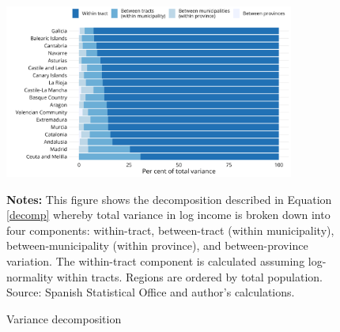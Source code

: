\begin{figure}[H]
\begin{center}
\captionsetup{justification=centering}
\caption{Variance decomposition}
\label{fig:variance_decomp}
\includegraphics[width=0.85\textwidth]{output/variance_decomp_2023.png}
\end{center}
\begin{fignotes2}
\textbf{Notes:} This figure shows the decomposition described in Equation \ref{decomp} whereby total variance in log income is broken down into four components: within-tract, between-tract (within municipality), between-municipality (within province), and between-province variation. The within-tract component is calculated assuming log-normality within tracts. Regions are ordered by total population. Source: Spanish Statistical Office and author's calculations.
\end{fignotes2}
\end{figure}